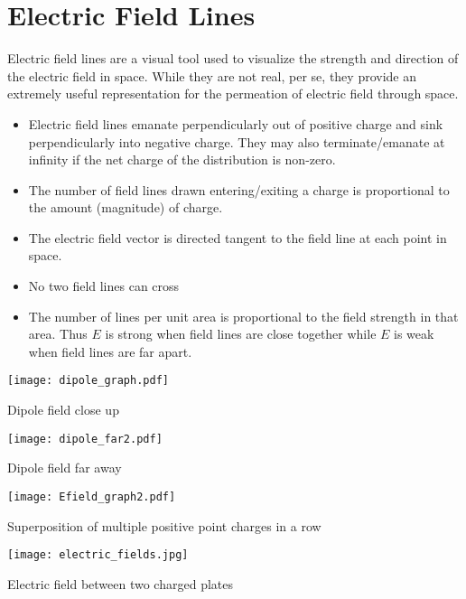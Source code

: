   \section{Electric Field Lines}
  Electric field lines are a visual tool used to visualize the strength and direction of the electric field in space.  While they are not real, per se, they provide an extremely useful representation for the permeation of electric field through space.  
  \begin{itemize}
 \item Electric field lines emanate perpendicularly out of positive charge and sink perpendicularly into negative charge.  They may also terminate/emanate at infinity if the net charge of the distribution is non-zero.
 \item The number of field lines drawn entering/exiting a charge is proportional to the amount (magnitude) of charge.
 \item  The electric field vector is directed tangent to the field line at each point in space.
 \item No two field lines can cross
 \item  The number of lines per unit area is proportional to the field strength in that area.  Thus $E$ is strong when field lines are close together while $E$ is weak when field lines are far apart.
 \
 \end{itemize}


\begin{marginfigure}[-250pt]%
  \texttt{[image: dipole\_graph.pdf]}
  \caption{Dipole field close up}
  \label{fig:marginfig}
\end{marginfigure}

\begin{marginfigure}[-40pt]%
  \texttt{[image: dipole\_far2.pdf]}
  \caption{Dipole field far away}
  \label{fig:marginfig}
\end{marginfigure}

\begin{marginfigure}[10pt]%
  \texttt{[image: Efield\_graph2.pdf]}
  \caption{Superposition of multiple positive point charges in a row}
  \label{fig:marginfig}
\end{marginfigure}

\begin{marginfigure}[0pt]%
  \texttt{[image: electric\_fields.jpg]}
  \caption{Electric field between two charged plates}
  \label{fig:marginfig}
\end{marginfigure}


